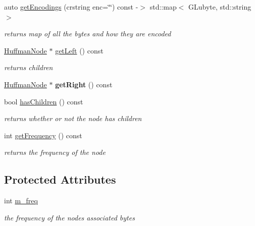 \begin{DoxyCompactItemize}
auto \hyperlink{classnta_1_1HuffmanNode_abbdee24e11a5a72a54f6187228f9b7f0}{get\+Encodings} (crstring enc=\char`\"{}\char`\"{}) const -\/$>$ std\+::map$<$ G\+Lubyte, std\+::string $>$
\begin{DoxyCompactList}\small\item\em returns map of all the bytes and how they are encoded \end{DoxyCompactList}\item 
\mbox{\label{classnta_1_1HuffmanNode_a2f67fd062ac5079cd40a0a82352d5a45}} 
\hyperlink{classnta_1_1HuffmanNode}{Huffman\+Node} $\ast$ \hyperlink{classnta_1_1HuffmanNode_a2f67fd062ac5079cd40a0a82352d5a45}{get\+Left} () const
\begin{DoxyCompactList}\small\item\em returns children \end{DoxyCompactList}\item 
\mbox{\label{classnta_1_1HuffmanNode_a3be8400f944090f38c48b17e890e5105}} 
\hyperlink{classnta_1_1HuffmanNode}{Huffman\+Node} $\ast$ {\bfseries get\+Right} () const
\item 
\mbox{\label{classnta_1_1HuffmanNode_a429374a0e433063935f6e86816be8831}} 
bool \hyperlink{classnta_1_1HuffmanNode_a429374a0e433063935f6e86816be8831}{has\+Children} () const
\begin{DoxyCompactList}\small\item\em returns whether or not the node has children \end{DoxyCompactList}\item 
\mbox{\label{classnta_1_1HuffmanNode_aaae7f78797726f30ce584e6fd0a282c1}} 
int \hyperlink{classnta_1_1HuffmanNode_aaae7f78797726f30ce584e6fd0a282c1}{get\+Frequency} () const
\begin{DoxyCompactList}\small\item\em returns the frequency of the node \end{DoxyCompactList}\end{DoxyCompactItemize}
\subsection*{Protected Attributes}
\begin{DoxyCompactItemize}
\item 
\mbox{\label{classnta_1_1HuffmanNode_acba67dc4c5cda81fa4f761a314b57d86}} 
int \hyperlink{classnta_1_1HuffmanNode_acba67dc4c5cda81fa4f761a314b57d86}{m\+\_\+freq}
\begin{DoxyCompactList}\small\item\em the frequency of the nodes associated bytes \end{DoxyCompactList}\end{DoxyCompactItemize}

